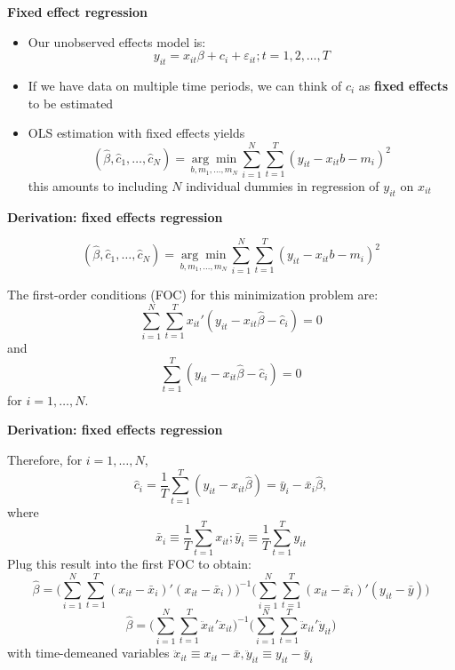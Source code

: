 \documentclass{beamer}
\begin{document}
\begin{frame}[plain]
	\begin{center}
	\textbf{Fixed effect regression}
	\end{center}
	
	\begin{itemize}
	\item Our unobserved effects model is:$$y_{it} = x_{it}\beta + c_i + \varepsilon_{it}; t=1,2,\dots,T$$
	\item If we have data on multiple time periods, we can think of $c_i$ as \textbf{fixed effects} to be estimated
	\item OLS estimation with fixed effects yields$$(\widehat{\beta}, \widehat{c}_1, \dots, \widehat{c}_N) = \underset{b,m_1,\dots,m_N}{\arg\!\min} \sum_{i=1}^N\sum_{t=1}^T (y_{it} - x_{it}b - m_i)^2$$this amounts to including $N$ individual dummies in regression of $y_{it}$ on $x_{it}$
	\end{itemize}
\end{frame}

\begin{frame}[plain]
	\begin{center}
	\textbf{Derivation: fixed effects regression}
	\end{center}
	
$$(\widehat{\beta}, \widehat{c}_1, \dots, \widehat{c}_N) = \underset{b,m_1,\dots,m_N}{\arg\!\min} \sum_{i=1}^N\sum_{t=1}^T (y_{it} - x_{it}b - m_i)^2$$

The first-order conditions (FOC) for this minimization problem are: $$\sum_{i=1}^N \sum_{t=1}^T x_{it}'(y_{it} - x_{it}\widehat{\beta} - \widehat{c}_i)=0$$ and $$\sum_{t=1}^T(y_{it} - x_{it}\widehat{\beta} - \widehat{c}_i) = 0 $$ for $i=1,\dots,N$.
	
\end{frame}

\begin{frame}[shrink=20,plain]
	\begin{center}
	\textbf{Derivation: fixed effects regression}
	\end{center}
	
Therefore, for $i=1, \dots, N$,$$\widehat{c}_i = \frac{1}{T} \sum_{t=1}^T(y_{it}-x_{it}\widehat{\beta})=\bar{y}_i-\bar{x}_i\widehat{\beta},$$where$$\bar{x}_i \equiv \frac{1}{T}\sum_{t=1}^Tx_{it}; \bar{y}_i \equiv \frac{1}{T} \sum_{t=1}^T y_{it}$$
Plug this result into the first FOC to obtain:$$\widehat{\beta} = \bigg( \sum_{i=1}^N \sum_{t=1}^T (x_{it} - \bar{x}_i)'(x_{it} - \bar{x}_i) \bigg)^{-1} \bigg( \sum_{i=1}^N \sum_{t=1}^T (x_{it} - \bar{x}_i)'(y_{it} - \bar{y})\bigg)$$ $$\widehat{\beta} = \bigg(\sum_{i=1}^N \sum_{t=1}^T \ddot{x}_{it}'\ddot{x}_{it} \bigg)^{-1} \bigg( \sum_{i=1}^N \sum_{t=1}^T \ddot{x}_{it}' \ddot{y}_{it} \bigg)$$
with time-demeaned variables $\ddot{x}_{it} \equiv x_{it}-\bar{x},\ddot{y}_{it} \equiv y_{it} - \bar{y}_i$
\end{frame}
\end{document}
